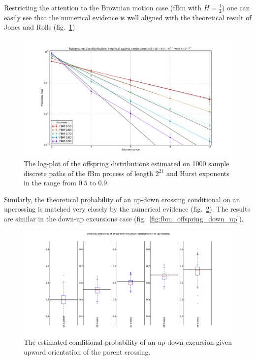 \documentclass[a4paper]{article}
\begin{document}
Restricting the attention to the Brownian motion case (fBm with $H=\frac{1}{2}$)
one can easily see that the numerical evidence is well aligned with the theoretical
result of Jones and Rolls (fig.~\ref{fig:fbm_offspring_distribution}).
\begin{figure}[htb]\begin{center}
    \includegraphics[width=6in]{images/fbm_fig_01_med_1000-21}
    \caption{The log-plot of the offspring distributions estimated on 1000 sample discrete paths
    of the fBm process of length $2^{21}$ and Hurst exponents in the range from $0.5$ to $0.9$.}
\label{fig:fbm_offspring_distribution}
\end{center}\end{figure}
Similarly, the theoretical probability of an up-down crossing conditional on an upcrossing
is matched very closely by the numerical evidence (fig.~\ref{fig:fbm_offspring_up_down}).
The results are similar in the down-up excursions case (fig.~\ref{fig:fbm_offspring_down_up}).

\begin{figure}[htb]\begin{center}
    \includegraphics[width=6in]{images/fbm_fig_03_up-down_med_1000-21}
    \caption{The estimated conditional probability of an up-down excursion given upward
    orientation of the parent crossing.}
\label{fig:fbm_offspring_up_down}
\end{center}\end{figure}
\end{document}

